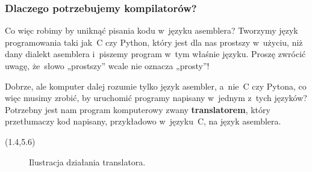 \documentclass[10pt,t]{beamer}
\begin{document}
\begin{frame}
  \frametitle{Dlaczego potrzebujemy kompilatorów?}

  \vspace{-0.75em}


  Co więc robimy by uniknąć pisania kodu w~języku asemblera? Tworzymy
  język programowania taki jak~C czy Python, który jest dla nas prostszy
  w~użyciu, niż dany dialekt asemblera i~piszemy program w~tym właśnie
  języku. Proszę zwrócić uwagę, że~słowo „prostszy” wcale nie oznacza
  \alert{„prosty”}!

  Dobrze, ale komputer dalej rozumie tylko język asembler, a~nie~C czy
  Pytona, co więc musimy zrobić, by uruchomić programy napisany w~jednym
  z~tych języków? Potrzebny jest nam program komputerowy zwany
  \textbf{translatorem}, który \alert{przetłumaczy} kod napisany,
  przykładowo w~języku~C, na język asemblera.





  \begin{textblock}{10.1}(1.4,5.6)

    \begin{figure}

      \label{fig:Translator-01}


      \caption{Ilustracja działania translatora.}


    \end{figure}

  \end{textblock}

\end{frame}
\end{document}
